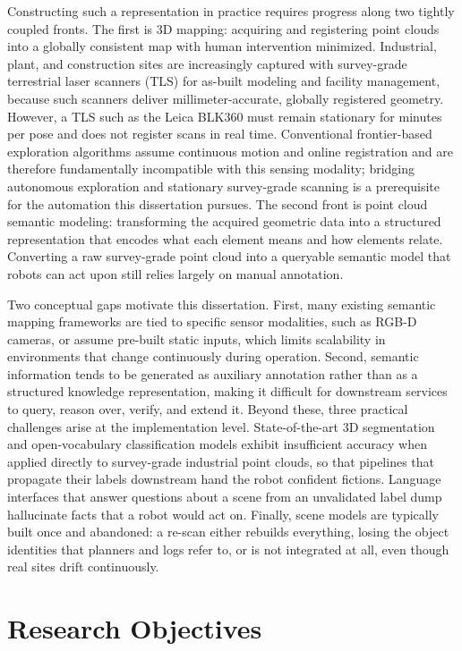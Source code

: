 Constructing such a representation in practice requires progress along two
tightly coupled fronts. The first is 3D mapping: acquiring and registering point
clouds into a globally consistent map with human intervention minimized.
Industrial, plant, and construction sites are increasingly captured with
survey-grade terrestrial laser scanners (TLS) for as-built modeling and facility
management, because such scanners deliver millimeter-accurate, globally
registered geometry. However, a TLS such as the Leica BLK360 must remain
stationary for minutes per pose and does not register scans in real time.
Conventional frontier-based exploration algorithms assume continuous motion and
online registration and are therefore fundamentally incompatible with this
sensing modality; bridging autonomous exploration and stationary survey-grade
scanning is a prerequisite for the automation this dissertation pursues. The
second front is point cloud semantic modeling: transforming the acquired
geometric data into a structured representation that encodes what each element
means and how elements relate. Converting a raw survey-grade point cloud into a
queryable semantic model that robots can act upon still relies largely on manual
annotation.

Two conceptual gaps motivate this dissertation. First, many existing semantic
mapping frameworks are tied to specific sensor modalities, such as RGB-D
cameras, or assume pre-built static inputs, which limits scalability in
environments that change continuously during operation. Second, semantic
information tends to be generated as auxiliary annotation rather than as a
structured knowledge representation, making it difficult for downstream
services to query, reason over, verify, and extend it. Beyond these, three
practical challenges arise at the implementation level. State-of-the-art 3D
segmentation and open-vocabulary classification models exhibit insufficient
accuracy when applied directly to survey-grade industrial point clouds, so that
pipelines that propagate their labels downstream hand the robot confident
fictions. Language interfaces that answer questions about a scene from an
unvalidated label dump hallucinate facts that a robot would act on. Finally,
scene models are typically built once and abandoned: a re-scan either rebuilds
everything, losing the object identities that planners and logs refer to, or is
not integrated at all, even though real sites drift continuously.

\section{Research Objectives}
\label{sec:objectives}

